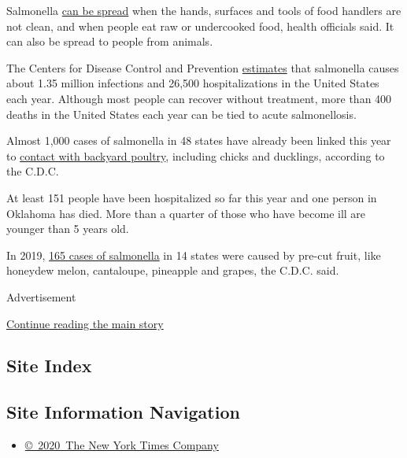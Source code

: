 Salmonella
\href{https://www.fda.gov/food/foodborne-pathogens/salmonella-salmonellosis}{can
be spread} when the hands, surfaces and tools of food handlers are not
clean, and when people eat raw or undercooked food, health officials
said. It can also be spread to people from animals.

The Centers for Disease Control and Prevention
\href{https://www.cdc.gov/salmonella/}{estimates} that salmonella causes
about 1.35 million infections and 26,500 hospitalizations in the United
States each year. Although most people can recover without treatment,
more than 400 deaths in the United States each year can be tied to acute
salmonellosis.

Almost 1,000 cases of salmonella in 48 states have already been linked
this year to
\href{https://www.cdc.gov/salmonella/backyardpoultry-05-20/index.html}{contact
with backyard poultry}, including chicks and ducklings, according to the
C.D.C.

At least 151 people have been hospitalized so far this year and one
person in Oklahoma has died. More than a quarter of those who have
become ill are younger than 5 years old.

In 2019,
\href{https://www.cdc.gov/salmonella/javiana-12-19/index.html}{165 cases
of salmonella} in 14 states were caused by pre-cut fruit, like honeydew
melon, cantaloupe, pineapple and grapes, the C.D.C. said.

Advertisement

\protect\hyperlink{after-bottom}{Continue reading the main story}

\hypertarget{site-index}{%
\subsection{Site Index}\label{site-index}}

\hypertarget{site-information-navigation}{%
\subsection{Site Information
Navigation}\label{site-information-navigation}}

\begin{itemize}
\tightlist
\item
  \href{https://help.nytimes.com/hc/en-us/articles/115014792127-Copyright-notice}{©~2020~The
  New York Times Company}
\end{itemize}

